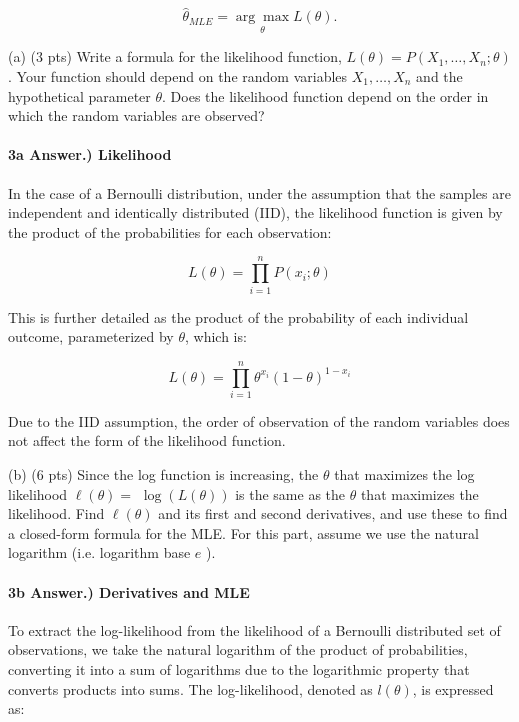 \documentclass[10pt]{article}
\begin{document}
$$
\hat{\theta}_{M L E}=\underset{\theta}{\arg \max } L(\theta) .
$$

(a) (3 pts) Write a formula for the likelihood function, $L(\theta)=P\left(X_{1}, \ldots, X_{n} ; \theta\right)$. Your function should depend on the random variables $X_{1}, \ldots, X_{n}$ and the hypothetical parameter $\theta$. Does the likelihood function depend on the order in which the random variables are observed?

\paragraph{ 3a Answer.) Likelihood }
\hspace{1cm}
In the case of a Bernoulli distribution, under the assumption that the samples are independent and identically distributed (IID), the likelihood function is given by the product of the probabilities for each observation:

\[ L(\theta) = \prod_{i=1}^{n} P(x_i; \theta) \]

This is further detailed as the product of the probability of each individual outcome, parameterized by \(\theta\), which is:

\[ L(\theta) = \prod_{i=1}^{n} \theta^{x_i} (1 - \theta)^{1 - x_i} \]

Due to the IID assumption, the order of observation of the random variables does not affect the form of the likelihood function.


(b) (6 pts) Since the log function is increasing, the $\theta$ that maximizes the log likelihood $\ell(\theta)=$ $\log (L(\theta))$ is the same as the $\theta$ that maximizes the likelihood. Find $\ell(\theta)$ and its first and second derivatives, and use these to find a closed-form formula for the MLE. For this part, assume we use the natural logarithm (i.e. logarithm base $e$ ).

\paragraph{ 3b Answer.) Derivatives and MLE}
\hspace{1cm}

To extract the log-likelihood from the likelihood of a Bernoulli distributed set of observations, we take the natural logarithm of the product of probabilities, converting it into a sum of logarithms due to the logarithmic property that converts products into sums. The log-likelihood, denoted as \( l(\theta) \), is expressed as:
\end{document}
